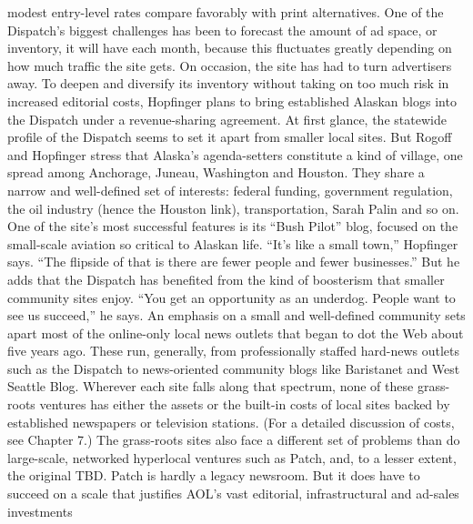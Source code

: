 modest entry-level rates compare favorably with print alternatives.
One of the Dispatch’s biggest challenges has been to forecast the amount of
ad space, or inventory, it will have each month, because this fluctuates greatly
depending on how much traffic the site gets. On occasion, the site has had to
turn advertisers away. To deepen and diversify its inventory without taking on
too much risk in increased editorial costs, Hopfinger plans to bring established
Alaskan blogs into the Dispatch under a revenue-sharing agreement.
At first glance, the statewide profile of the Dispatch seems to set it apart from
smaller local sites. But Rogoff and Hopfinger stress that Alaska’s agenda-setters
constitute a kind of village, one spread among Anchorage, Juneau, Washington
and Houston. They share a narrow and well-defined set of interests: federal funding,
government regulation, the oil industry (hence the Houston link), transportation,
Sarah Palin and so on. One of the site’s most successful features is its ``Bush
Pilot'' blog, focused on the small-scale aviation so critical to Alaskan life.
``It’s like a small town,'' Hopfinger says. ``The flipside of that is there are fewer
people and fewer businesses.'' But he adds that the Dispatch has benefited from
the kind of boosterism that smaller community sites enjoy. ``You get an opportunity
as an underdog. People want to see us succeed,'' he says.
An emphasis on a small and well-defined community sets apart most of the
online-only local news outlets that began to dot the Web about five years ago.
These run, generally, from professionally staffed hard-news outlets such as the
Dispatch to news-oriented community blogs like Baristanet and West Seattle
Blog. Wherever each site falls along that spectrum, none of these grass-roots
ventures has either the assets or the built-in costs of local sites backed by established
newspapers or television stations. (For a detailed discussion of costs,
see Chapter 7.)
The grass-roots sites also face a different set of problems than do large-scale,
networked hyperlocal ventures such as Patch, and, to a lesser extent, the original
TBD. Patch is hardly a legacy newsroom. But it does have to succeed on a
scale that justifies AOL’s vast editorial, infrastructural and ad-sales investments

